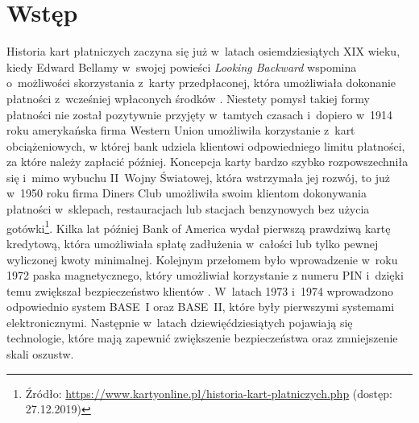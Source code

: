 \documentclass[inzynierska]{pwr_wmat_praca_dyplomowa}
\theoremstyle{plain}
\numberwithin{theorem}{chapter}
\theoremstyle{definition}
\numberwithin{theorem}{chapter}
\begin{document}
	
\newcommand{\htx}{h_{\theta}(\boldsymbol{x_i})}
\newcommand{\es}{\mathcal{S}}
\newcommand{\ef}{\mathcal{F}}
\newcommand{\ku}{\mathcal{Q}}
\newcommand{\iks}{\boldsymbol{x}}
\newcommand{\yht}[1]{\hat{y_i}^{(#1)}}
\newcommand{\ytrue}{\boldsymbol{y}}


\frontmatter
\maketitle
\tableofcontents
\mainmatter



\chapter*{Wstęp}
 

Historia kart płatniczych zaczyna się już w~latach osiemdziesiątych XIX wieku, kiedy Edward Bellamy w~swojej powieści \textit{Looking Backward} wspomina o~możliwości skorzystania z~karty przedpłaconej, która umożliwiała dokonanie płatności z~wcześniej wpłaconych środków \cite{wiki:karta_platnicza}. Niestety pomysł takiej formy płatności nie został pozytywnie przyjęty w~tamtych czasach i~dopiero w~1914 roku amerykańska firma Western Union umożliwiła korzystanie z~kart obciążeniowych, w której bank udziela klientowi odpowiedniego limitu płatności, za które należy zapłacić później. Koncepcja karty bardzo szybko rozpowszechniła się i~mimo wybuchu II~Wojny Światowej, która wstrzymała jej rozwój, to już w~1950 roku firma Diners Club umożliwiła swoim klientom dokonywania płatności w~sklepach, restauracjach lub stacjach benzynowych bez użycia gotówki\footnote{Źródło: \url{https://www.kartyonline.pl/historia-kart-platniczych.php} (dostęp: 27.12.2019)}. Kilka lat później Bank of America wydał pierwszą prawdziwą kartę kredytową, która umożliwiała spłatę zadłużenia w~całości lub tylko pewnej wyliczonej kwoty minimalnej. Kolejnym przełomem było wprowadzenie w~roku 1972 paska magnetycznego, który umożliwiał korzystanie z numeru PIN i~dzięki temu zwiększał bezpieczeństwo klientów \cite{wiki:payment_card}. W~latach 1973 i~1974 wprowadzono odpowiednio system BASE~I oraz BASE~II, które były pierwszymi systemami elektronicznymi. Następnie w~latach dziewięćdziesiątych pojawiają się technologie, które mają zapewnić zwiększenie bezpieczeństwa oraz zmniejszenie skali oszustw.
\end{document}
